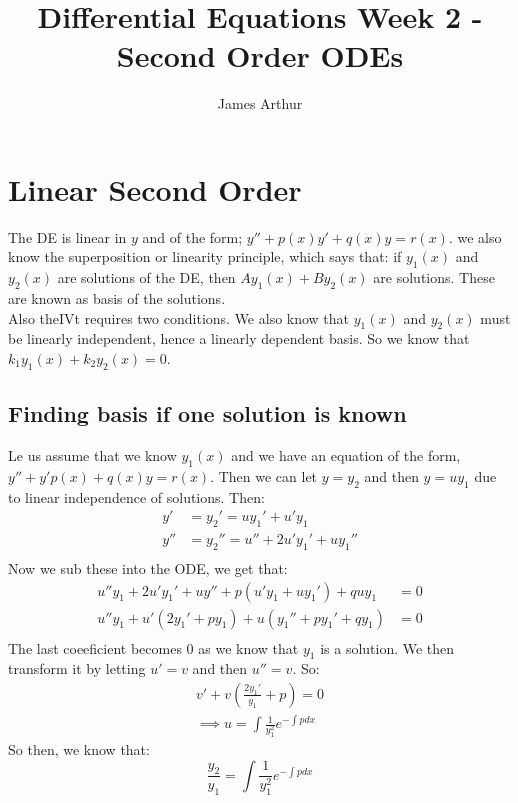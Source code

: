 \documentclass{article}
\title{Differential Equations Week 2 - Second Order ODEs}
\author{James Arthur}
\begin{document}
\maketitle
\tableofcontents\newpage



\section{Linear Second Order}

The DE is linear in $y$ and of the form; $y'' + p(x)y' + q(x)y = r(x)$. we also know the {\color{blue} superposition or linearity principle}, which says that: if $y_1(x)$ and $y_2(x)$ are solutions of the DE, then $Ay_1(x) + By_2(x)$ are solutions. These are known as basis of the solutions. \\

Also theIVt requires two conditions. We also know that $y_1(x)$ and $y_2(x)$ must be linearly independent, hence a linearly dependent basis. So we know that $k_1y_1(x) + k_2y_2(x) = 0$.

\subsection{Finding basis if one solution is known}
Le us assume that we know $y_1(x)$ and we have an equation of the form, $y'' + y'p(x) + q(x)y = r(x)$. Then we can let $y = y_2$ and then $y = uy_1$ due to linear independence of solutions. Then:
\begin{align*}
  y' &= y_2' = uy_1' + u'y_1 \\
  y'' &= y_2'' = u'' + 2u'y_1' + uy_1''\\
\end{align*}
Now we sub these into the ODE, we get that:
\begin{align*}
  u''y_1 + 2u'y_1' + uy'' + p(u'y_1 + uy_1') + quy_1 &= 0\\
  u''y_1 + u'(2y_1' + py_1) + u(y_1'' + py_1' + qy_1) &= 0\\
\end{align*}
The last coeeficient becomes $0$ as we know that $y_1$ is a solution. We then transform it by letting $u' = v$ and then $u'' = v$. So:
\begin{align*}
  v' + v\left( \frac{2y_1'}{y_1} + p\right) = 0 \\
  \implies u = \int{\frac{1}{y_1^2}e^{-\int{pdx}}}
\end{align*}
So then, we know that:
$$ \frac{y_2}{y_1} = \int{\frac{1}{y_1^2}e^{-\int{pdx}}} $$
\end{document}
